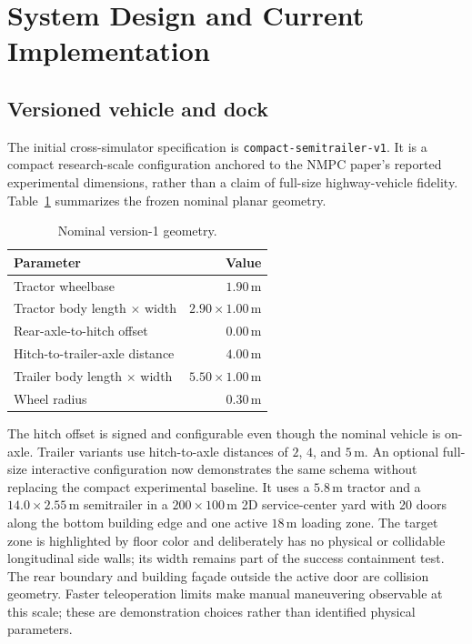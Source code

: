 \section{System Design and Current Implementation}

\subsection{Versioned vehicle and dock}

The initial cross-simulator specification is
\texttt{compact-semitrailer-v1}. It is a compact research-scale configuration
anchored to the NMPC paper's reported experimental dimensions, rather than a
claim of full-size highway-vehicle fidelity. Table~\ref{tab:geometry} summarizes
the frozen nominal planar geometry.

\begin{table}[ht]
  \centering
  \caption{Nominal version-1 geometry.}
  \label{tab:geometry}
  \begin{tabular}{lr}
    \toprule
    Parameter & Value \\
    \midrule
    Tractor wheelbase & $1.90\,\mathrm{m}$ \\
    Tractor body length $\times$ width & $2.90\times1.00\,\mathrm{m}$ \\
    Rear-axle-to-hitch offset & $0.00\,\mathrm{m}$ \\
    Hitch-to-trailer-axle distance & $4.00\,\mathrm{m}$ \\
    Trailer body length $\times$ width & $5.50\times1.00\,\mathrm{m}$ \\
    Wheel radius & $0.30\,\mathrm{m}$ \\
    \bottomrule
  \end{tabular}
\end{table}

The hitch offset is signed and configurable even though the nominal vehicle is
on-axle. Trailer variants use hitch-to-axle distances of $2$, $4$, and
$5\,\mathrm{m}$. An optional full-size interactive configuration now
demonstrates the same schema without replacing the compact experimental
baseline. It uses a $5.8\,\mathrm{m}$ tractor and a
$14.0\times2.55\,\mathrm{m}$ semitrailer in a $200\times100\,\mathrm{m}$ 2D
service-center yard with 20 doors along the bottom building edge and one active
$18\,\mathrm{m}$ loading zone. The target zone is highlighted by floor color
and deliberately has no physical or collidable longitudinal side walls; its
width remains part of the success containment test. The rear boundary and
building façade outside the active door are collision geometry. Faster
teleoperation limits make manual maneuvering observable at this scale; these
are demonstration choices rather than identified physical parameters.

